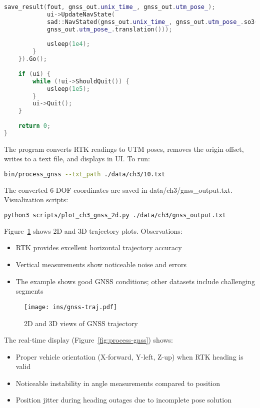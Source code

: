 \begin{lstlisting}[language=c++,caption=ch3/process\_gnss.cc]
			save_result(fout, gnss_out.unix_time_, gnss_out.utm_pose_);
			ui->UpdateNavState(
			sad::NavStated(gnss_out.unix_time_, gnss_out.utm_pose_.so3(), 
			gnss_out.utm_pose_.translation()));
			
			usleep(1e4);
		}
	}).Go();
	
	if (ui) {
		while (!ui->ShouldQuit()) {
			usleep(1e5);
		}
		ui->Quit();
	}
	
	return 0;
}
\end{lstlisting}

The program converts RTK readings to UTM poses, removes the origin offset, writes to a text file, and displays in UI. To run:

\begin{lstlisting}[language=sh, caption=Terminal command:]
	bin/process_gnss --txt_path ./data/ch3/10.txt
\end{lstlisting}

The converted 6-DOF coordinates are saved in data/ch3/gnss_output.txt. Visualization scripts:

\begin{lstlisting}[language=sh, caption=Terminal command:]
	python3 scripts/plot_ch3_gnss_2d.py ./data/ch3/gnss_output.txt 
\end{lstlisting}

Figure~\ref{fig:gnss-traj} shows 2D and 3D trajectory plots. Observations:
\begin{itemize}
	\item RTK provides excellent horizontal trajectory accuracy
	\item Vertical measurements show noticeable noise and errors
	\item The example shows good GNSS conditions; other datasets include challenging segments
\end{itemize}

\begin{figure}
	\centering
	\texttt{[image: ins/gnss-traj.pdf]}
	\caption{2D and 3D views of GNSS trajectory}
	\label{fig:gnss-traj}
\end{figure}

The real-time display (Figure~\ref{fig:process-gnss}) shows:
\begin{itemize}
	\item Proper vehicle orientation (X-forward, Y-left, Z-up) when RTK heading is valid
	\item Noticeable instability in angle measurements compared to position
	\item Position jitter during heading outages due to incomplete pose solution
\end{itemize}

